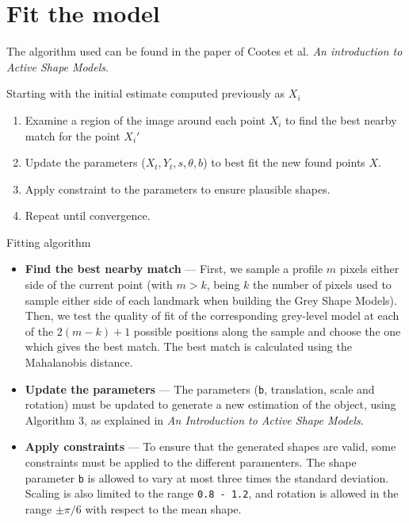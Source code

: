 \section{Fit the model}

The algorithm used can be found in the paper of Cootes et al.
\textit{An introduction to Active Shape Models}.

Starting with the initial estimate computed previously as $X_i$
\begin{algorithm}[h]
  \begin{enumerate}
  \item Examine a region of the image around each point $X_i$
    to find the best nearby match for the point ${X_i}'$
  \item Update the parameters ($X_t, Y_t, s, \theta, b$) to best
    fit the new found points $X$.
  \item Apply constraint to the parameters to ensure
    plausible shapes.
  \item Repeat until convergence.
 \end{enumerate}
\caption{Fitting algorithm}
\end{algorithm}

\begin{itemize}
\item \textbf{Find the best nearby match} --- First, we sample a
  profile $m$ pixels either side of the current point (with
  $m > k$, being $k$ the number of pixels used to sample either side
  of each landmark when building the Grey Shape Models). Then, we
  test the quality of fit of the corresponding grey-level model
  at each of the $2(m-k)+1$ possible positions along the sample
  and choose the one which gives the best match.
  The best match is calculated using the Mahalanobis distance.
\item \textbf{Update the parameters} --- The parameters (\texttt{b},
  translation, scale and rotation)
  must be updated to generate a new estimation of the object, using
  Algorithm 3, as explained in
  \textit{An Introduction to Active Shape Models}.
\item \textbf{Apply constraints} --- To ensure that the generated
  shapes are valid, some constraints must be applied to the different
  paramenters. The shape parameter \texttt{b} is allowed to vary at most
  three times the standard deviation. Scaling is also limited to the range
  \texttt{0.8 - 1.2}, and rotation is allowed in the range $\pm\pi/6$
  with respect to the mean shape.
\end{itemize}

